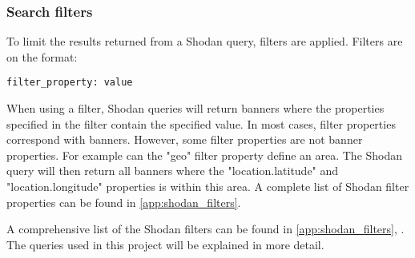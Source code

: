 \subsubsection{Search filters} \label{sec:filters}
To limit the results returned from a Shodan query, filters are applied. Filters are on the format:
\begin{lstlisting}
filter_property: value
\end{lstlisting}
When using a filter, Shodan queries will return banners where the properties specified in the filter contain the specified value. In most cases, filter properties correspond with banners. However, some filter properties are not banner properties. For example can the "geo" filter property define an area. The Shodan query will then return all banners where the "location.latitude" and "location.longitude" properties is within this area. A complete list of Shodan filter properties can be found in \cref{app:shodan_filters}.

A comprehensive list of the Shodan filters can be found in \cref{app:shodan_filters}, . The queries used in this project will be explained in more detail. 

